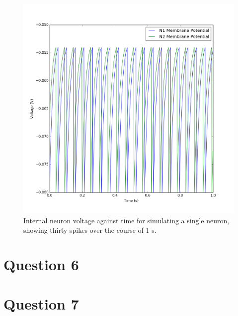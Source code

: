 \documentclass[12pt, a4paper]{article}
\begin{document}
\begin{figure}[H]
  \centering
  \includegraphics[width=1\linewidth]{figures/q5b}
  \caption{Internal neuron voltage against time for simulating a single neuron, showing thirty spikes over the course of 1 s.}
\end{figure}

\section*{Question 6}

\section*{Question 7}


\bibdata
\end{document}
